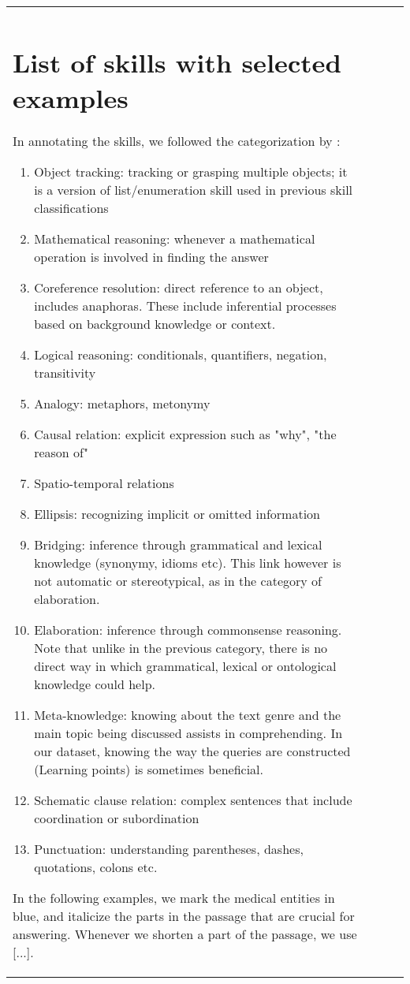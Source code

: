 \documentclass[11pt,a4paper]{article}
\begin{document}
\begin{table}[t]
\begin{tabular}{p{2.7cm} p{1.8cm} l r}
{\section{List of skills with selected examples}\label{app:skills}
In annotating the skills, we followed the categorization by \citet{SugawaraEtAl2017a}:
\begin{enumerate}
\item Object tracking: tracking or grasping multiple objects; it is a version of list/enumeration skill used in previous skill classifications
\item Mathematical reasoning: whenever a mathematical operation is involved in finding the answer
\item Coreference resolution: direct reference to an object, includes anaphoras. These include inferential processes based on background knowledge or context.
\item Logical reasoning: conditionals, quantifiers, negation, transitivity
\item Analogy: metaphors, metonymy
\item Causal relation: explicit expression such as "why", "the reason of"
\item Spatio-temporal relations
\item Ellipsis: recognizing implicit or omitted information
\item Bridging: inference through grammatical and lexical knowledge (synonymy, idioms etc). 
This link however is not automatic or stereotypical, as in the category of elaboration.
\item Elaboration: inference through commonsense reasoning. 
Note that unlike in the previous category, there is no direct way in which grammatical, lexical or ontological knowledge could help.
\item Meta-knowledge: knowing about the text genre and the main topic being discussed assists in comprehending. In our dataset, knowing the way the queries are constructed (Learning points) is sometimes beneficial.
\item Schematic clause relation: complex sentences that include coordination or subordination
\item Punctuation: understanding parentheses, dashes, quotations, colons etc.
\end{enumerate}

In the following examples, we mark the medical entities in blue, and italicize the parts in the passage that are crucial for answering. Whenever we shorten a part of the passage, we use [...].

}
\end{tabular}
\end{table}
\end{document}
